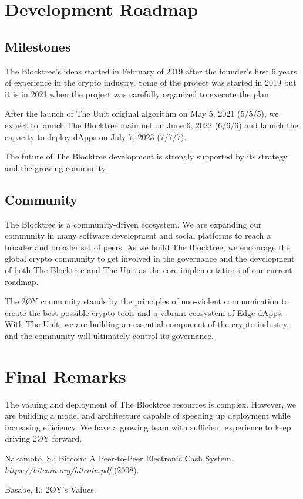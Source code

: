 \documentclass[12pt]{article}
\begin{document}
  
\section{Development Roadmap}


\subsection{Milestones}

The Blocktree's ideas started in February of 2019 after the founder's first 6 years of experience in the crypto industry. Some of the project was started in 2019 but it is in 2021 when the project was carefully organized to execute the plan.

After the launch of The Unit original algorithm on May 5, 2021 (5/5/5), we expect to launch The Blocktree main net on June 6, 2022 (6/6/6) and launch the capacity to deploy dApps on July 7, 2023 (7/7/7).

The future of The Blocktree development is strongly supported by its strategy and the growing community.


\subsection{Community}

The Blocktree is a community-driven ecosystem. We are expanding our community in many software development and social platforms to reach a broader and broader set of peers. As we build The Blocktree, we encourage the global crypto community to get involved in the governance and the development of both The Blocktree and The Unit as the core implementations of our current roadmap.

The 2ØY community stands by the principles of non-violent communication to create the best possible crypto tools and a vibrant ecosystem of Edge dApps. With The Unit, we are building an essential component of the crypto industry, and the community will ultimately control its governance.

\section{Final Remarks}

The valuing and deployment of The Blocktree resources is complex. However, we are building a model and architecture capable of speeding up deployment while increasing efficiency. We have a growing team with sufficient experience to keep driving 2ØY forward.


\begin{thebibliography}{[BLSWZ9]}


 Nakamoto, S.: Bitcoin: A Peer-to-Peer Electronic Cash System. \emph{https://bitcoin.org/bitcoin.pdf} (2008).


 Basabe, I.: 2ØY's Values.



\end{thebibliography}
\end{document}
